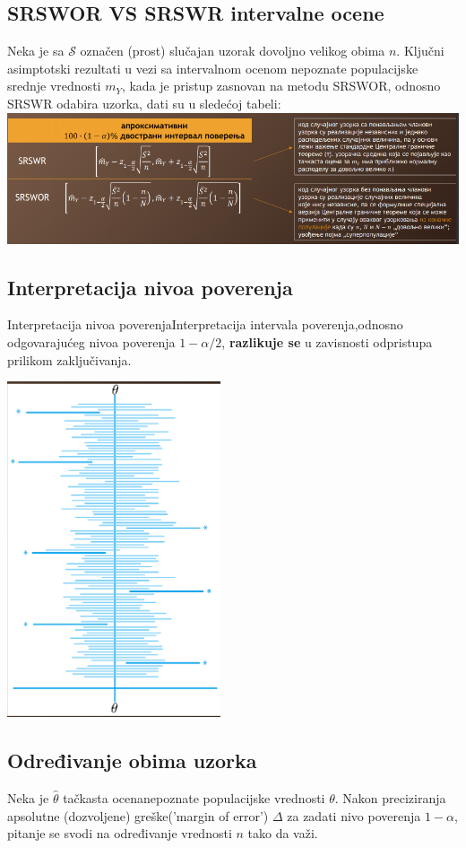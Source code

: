 \documentclass[10pt,a4paper,]{article}
\begin{document}
\subsection{SRSWOR VS SRSWR intervalne ocene}
Neka je sa $\mathcal{S}$ označen (prost) slučajan uzorak dovoljno velikog obima $n$. 
Ključni asimptotski 
rezultati u vezi sa intervalnom ocenom nepoznate populacijske srednje vrednosti $m_Y$, 
kada je 
pristup zasnovan na metodu SRSWOR, odnosno SRSWR odabira uzorka, dati su u sledećoj 
tabeli:\\
\includegraphics[scale=0.4]{primer10.png}


\subsection{Interpretacija nivoa poverenja}
\begin{multicols}{2}
Interpretacija nivoa poverenjaInterpretacija intervala poverenja,odnosno odgovarajućeg 
nivoa poverenja $1-\alpha/2$, \textbf{razlikuje se} u zavisnosti odpristupa prilikom zaključivanja.

\includegraphics[scale=0.5]{primer11.png}
\end{multicols}


\subsection{Određivanje obima uzorka}
Neka je $\hat{\theta}$ tačkasta ocenanepoznate populacijske vrednosti $\theta$. 
Nakon preciziranja apsolutne 
(dozvoljene) greške('margin of error') $\Delta$ za 
zadati nivo poverenja $1-\alpha$, pitanje se svodi na 
određivanje vrednosti $n$ tako da važi.
\end{document}
